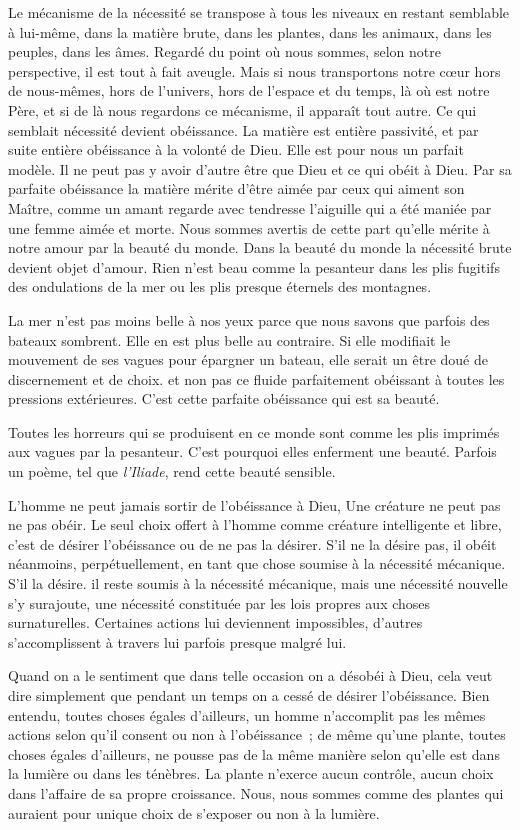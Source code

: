 \documentclass[french,twoside]{book} %
\begin{document}
Le mécanisme de la nécessité se transpose à tous les niveaux en restant semblable à lui-même, dans la matière brute, dans les plantes, dans les animaux, dans les peuples, dans les âmes. Regardé du point où nous sommes, selon notre perspective, il est tout à fait aveugle. Mais si nous transportons notre cœur hors de nous-mêmes, hors de l'univers, hors de l'espace et du temps, là où est notre Père, et si de là nous regardons ce mécanisme, il apparaît tout autre. Ce qui semblait nécessité devient obéissance. La matière est entière passivité, et par suite entière obéissance à la volonté de Dieu. Elle est pour nous un parfait modèle. Il ne peut pas y avoir d'autre être que Dieu et ce qui obéit à Dieu. Par sa parfaite obéissance la matière mérite d'être aimée par ceux qui aiment son Maître, comme un amant regarde avec tendresse l'aiguille qui a été maniée par une femme aimée et morte. Nous sommes avertis de cette part qu'elle mérite à notre amour par la beauté du monde. Dans la beauté du monde la nécessité brute devient objet d'amour. Rien n'est beau comme la pesanteur dans les plis fugitifs des ondulations de la mer ou les plis presque éternels des montagnes.\par
La mer n'est pas moins belle à nos yeux parce que nous savons que parfois des bateaux sombrent. Elle en est plus belle au contraire. Si elle modifiait le mouvement de ses vagues pour épargner un bateau, elle serait un être doué de discernement et de choix. et non pas ce fluide parfaitement obéissant à toutes les pressions extérieures. C'est cette parfaite obéissance qui est sa beauté.\par
Toutes les horreurs qui se produisent en ce monde sont comme les plis imprimés aux vagues par la pesanteur. C'est pourquoi elles enferment une beauté. Parfois un poème, tel que {\itshape l'Iliade}, rend cette beauté sensible.\par
L'homme ne peut jamais sortir de l'obéissance à Dieu, Une créature ne peut pas ne pas obéir. Le seul choix offert à l'homme comme créature intelligente et libre, c'est de désirer l'obéissance ou de ne pas la désirer. S'il ne la désire pas, il obéit néanmoins, perpétuellement, en tant que chose soumise à la nécessité mécanique. S'il la désire. il reste soumis à la nécessité mécanique, mais une nécessité nouvelle s'y surajoute, une nécessité constituée par les lois propres aux choses surnaturelles. Certaines actions lui deviennent impossibles, d'autres s'accomplissent à travers lui parfois presque malgré lui.\par
Quand on a le sentiment que dans telle occasion on a désobéi à Dieu, cela veut dire simplement que pendant un temps on a cessé de désirer l'obéissance. Bien entendu, toutes choses égales d'ailleurs, un homme n'accomplit pas les mêmes actions selon qu'il consent ou non à l'obéissance ; de même qu'une plante, toutes choses égales d'ailleurs, ne pousse pas de la même manière selon qu'elle est dans la lumière ou dans les ténèbres. La plante n'exerce aucun contrôle, aucun choix dans l'affaire de sa propre croissance. Nous, nous sommes comme des plantes qui auraient pour unique choix de s'exposer ou non à la lumière.\par
\end{document}
